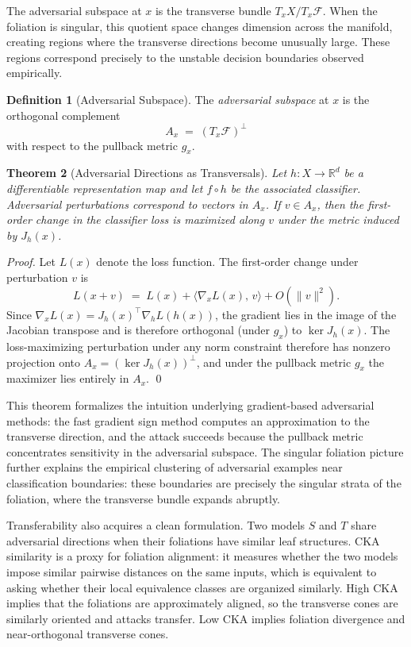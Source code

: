 \documentclass[12pt,a4paper]{article}
\theoremstyle{plain}
\newtheorem{theorem}{Theorem}[section]
\theoremstyle{definition}
\newtheorem{definition}[theorem]{Definition}
\begin{document}
The adversarial subspace at $x$ is the transverse bundle $T_x X / T_x
\mathcal{F}$. When the foliation is singular, this quotient space changes
dimension across the manifold, creating regions where the transverse directions
become unusually large. These regions correspond precisely to the unstable
decision boundaries observed empirically.

\begin{definition}[Adversarial Subspace]
The \emph{adversarial subspace} at $x$ is the orthogonal complement
\[
A_x \;=\; (T_x \mathcal{F})^\perp
\]
with respect to the pullback metric $g_x$.
\end{definition}

\begin{theorem}[Adversarial Directions as Transversals]
\label{thm:adversarial}
Let $h : X \to \mathbb{R}^d$ be a differentiable representation map and let
$f \circ h$ be the associated classifier. Adversarial perturbations correspond
to vectors in $A_x$. If $v \in A_x$, then the first-order change in the
classifier loss is maximized along $v$ under the metric induced by $J_h(x)$.
\end{theorem}

\begin{proof}
Let $L(x)$ denote the loss function. The first-order change under perturbation
$v$ is
\[
L(x + v) \;=\; L(x) + \langle \nabla_x L(x),\, v \rangle + O(\|v\|^2).
\]
Since $\nabla_x L(x) = J_h(x)^\top \nabla_{h} L(h(x))$, the gradient lies in
the image of the Jacobian transpose and is therefore orthogonal (under $g_x$)
to $\ker J_h(x)$. The loss-maximizing perturbation under any norm constraint
therefore has nonzero projection onto $A_x = (\ker J_h(x))^\perp$, and under
the pullback metric $g_x$ the maximizer lies entirely in $A_x$. \qed
\end{proof}

This theorem formalizes the intuition underlying gradient-based adversarial
methods: the fast gradient sign method computes an approximation to the
transverse direction, and the attack succeeds because the pullback metric
concentrates sensitivity in the adversarial subspace. The singular foliation
picture further explains the empirical clustering of adversarial examples near
classification boundaries: these boundaries are precisely the singular strata
of the foliation, where the transverse bundle expands abruptly.

Transferability also acquires a clean formulation. Two models $S$ and $T$ share
adversarial directions when their foliations have similar leaf structures.
CKA similarity is a proxy for foliation alignment: it measures whether the two
models impose similar pairwise distances on the same inputs, which is equivalent
to asking whether their local equivalence classes are organized similarly. High
CKA implies that the foliations are approximately aligned, so the transverse
cones are similarly oriented and attacks transfer. Low CKA implies foliation
divergence and near-orthogonal transverse cones.
\end{document}
